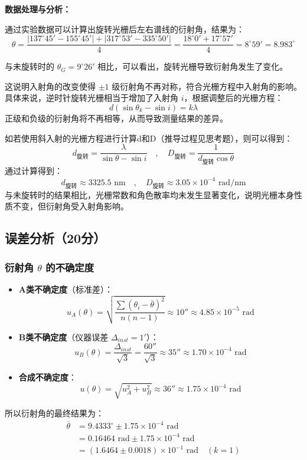 \documentclass[]{../template/Report}%
\begin{document}
\begin{fullreportonly}
\textbf{数据处理与分析：}

通过实验数据可以计算出旋转光栅后左右谱线的衍射角，结果为：
\[
    \theta = \frac{|137^\circ 45' - 155^\circ 45'| + |317^\circ 53' - 335^\circ 50'|}{4} = \frac{18^\circ 0' + 17^\circ 57'}{4} = 8^\circ 59' = 8.983^\circ
\]

与未旋转时的 $\theta_G = 9^\circ 26'$ 相比，可以看出，旋转光栅导致衍射角发生了变化。

这说明入射角的改变使得 $\pm 1$ 级衍射角不再对称，符合光栅方程中入射角的影响。具体来说，逆时针旋转光栅相当于增加了入射角 $i$，根据调整后的光栅方程：
\[
d(\sin \theta_k - \sin i) = k\lambda
\]
正级和负级的衍射角将不再相等，从而导致测量结果的差异。

如若使用斜入射的光栅方程进行计算d和D（推导过程见思考题），则可以得到：
\[
    d_{\text{旋转}} = \frac{\lambda}{\sin \theta-\sin i} \quad , \quad D_{\text{旋转}} = \frac{1}{d_{\text{旋转}} \cos \theta}
\]
通过计算得到：
\[
    d_{\text{旋转}} \approx 3325.5 \text{ nm} \quad , \quad D_{\text{旋转}} \approx 3.05 \times 10^{-4} \text{ rad/nm}
\]
与未旋转时的结果相比，光栅常数和角色散率均未发生显著变化，说明光栅本身性质不变，但衍射角受入射角影响。


\subsection{误差分析（20分）}

\subsubsection{衍射角 $\theta$ 的不确定度}
\begin{itemize}
    \item \textbf{A类不确定度}（标准差）：
    \[
    u_A(\theta) = \sqrt{\frac{\sum (\theta_i - \bar{\theta})^2}{n(n-1)}} \approx 10'' \approx 4.85 \times 10^{-5} \text{ rad}
    \]
    \item \textbf{B类不确定度}（仪器误差 $\Delta_{inst} = 1'$）：
    \[
    u_B(\theta) = \frac{\Delta_{inst}}{\sqrt{3}} = \frac{60''}{\sqrt{3}} \approx 35'' \approx 1.70 \times 10^{-4} \text{ rad}
    \]
    \item \textbf{合成不确定度}：
    \[
    u(\theta) = \sqrt{u_A^2 + u_B^2} \approx 36'' \approx 1.75 \times 10^{-4} \text{ rad}
    \]
\end{itemize}

所以衍射角的最终结果为：
\begin{align*}
\overline{\theta} &= 9.4333^\circ \pm  1.75 \times 10^{-4} \text{ rad}  \\
 &= 0.16464 \text{ rad} \pm 1.75 \times 10^{-4} \text{ rad} \\
 &= (1.6464 \pm 0.0018)\times 10^{-1} \text{ rad} \quad (k=1)
\end{align*}

\end{fullreportonly}
\end{document}
